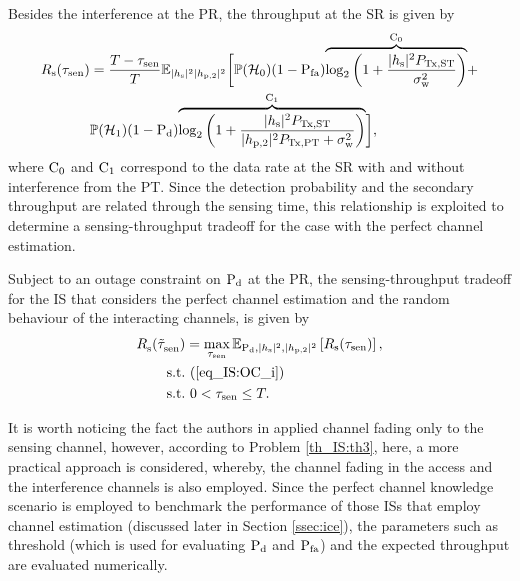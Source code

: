 Besides the interference at the PR, the throughput at the SR is given by %
\begin{align}
R_{\text{s}}(\tau_{\text{sen}}) &= \frac{T - \tau_{\text{sen}}}{T} \mathbb{E}_{|h_{\text{s}}|^2 |h_{\text{p,2}}|^2} \bigg[ \mathbb P(\mathcal{H}_0) (1 - \text{P}_{\text{fa}}) \smash[b]{\overbrace{\log_2 \bigg( 1 + \frac{|h_{\text{s}}|^2 P_{\text{Tx,ST}}}{\sigma^2_{\text{w}}} \bigg)}^{\text{C}_{\text{0}}}} + \nonumber \\ & \mathbb P(\mathcal{H}_1) (1 - \text{P}_{\text{d}}) \smash[b]{\overbrace{\log_2 \bigg( 1 + \frac{|h_{\text{s}}|^2 P_{\text{Tx,ST}}}{|h_{\text{p,2}}|^2 P_{\text{Tx,PT}} + \sigma^2_{\text{w}}} \bigg)}^{\text{C}_{\text{1}}}} \bigg], \label{eq_IS:thr_i} 
\end{align}
where $\text{C}_{\text{0}}$ and $\text{C}_{\text{1}}$ correspond to the data rate at the SR with and without interference from the PT. %
Since the detection probability and the secondary throughput are related through the sensing time, this relationship is exploited to determine a sensing-throughput tradeoff for the case with the perfect channel estimation.
\begin{theorem} \label{th_IS:th3}
\normalfont
Subject to an outage constraint on $\text{P}_{\text{d}}$ at the PR, the sensing-throughput tradeoff for the IS that considers the perfect channel estimation and the random behaviour of the interacting channels, is given by
\begin{align}
{R}_{\text{s}}^{\text{}}(\tilde{\tau}_{\text{sen}}^{\text{}}) &= \operatorname*{max}_{\tau_{\text{sen}}} {\mathbb E}_{\text{P}_{\text{d}}, |h_{\text{s}}|^2, |h_{\text{p,2}}|^2}\left[ R_{\text{s}}(\tau_{\text{sen}}) \right], \label{eq_IS:STT_i} \\
\text{s.t.} & \text{ }  (\ref{eq_IS:OC_i}) \nonumber \\ 
\text{s.t.} & \text{ }  0 < \tau_{\text{sen}} \le T. \nonumber
\end{align}
\end{theorem}
\begin{remark} \label{rem:rem1}
\normalfont
It is worth noticing the fact the authors in \cite{Juarez11} applied channel fading only to the sensing channel, however, according to Problem \ref{th_IS:th3}, here, a more practical approach is considered, whereby, the channel fading in the access and the interference channels is also employed. Since the perfect channel knowledge scenario is employed to benchmark the performance of those ISs that employ channel estimation (discussed later in Section \ref{ssec:ice}), the parameters such as threshold (which is used for evaluating $\text{P}_{\text{d}}$ and $\text{P}_{\text{fa}}$) and the expected throughput are evaluated numerically.%
\end{remark}


